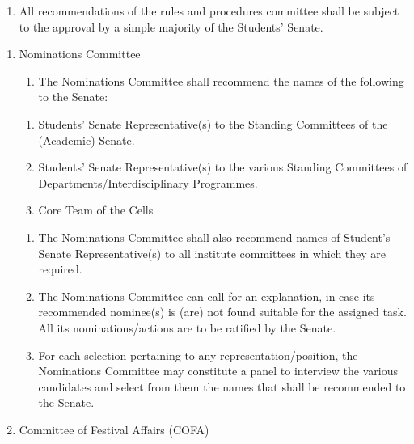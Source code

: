 \begin{enumerate}
\def\labelenumi{\alph{enumi}.}
\setcounter{enumi}{1}
\itemsep1pt\parskip0pt
\item
  All recommendations of the rules and procedures committee shall be
  subject to the approval by a simple majority of the Students' Senate.
\end{enumerate}

\begin{enumerate}
\def\labelenumi{\arabic{enumi}.}
\setcounter{enumi}{3}
\item
  Nominations Committee

  \begin{enumerate}
  \def\labelenumii{\alph{enumii}.}
  \itemsep1pt\parskip0pt
  \item
    The Nominations Committee shall recommend the names of the following
    to the Senate:
  \end{enumerate}

  \begin{enumerate}
  \def\labelenumii{\arabic{enumii}.}
  \item
    Students' Senate Representative(s) to the Standing Committees of the
    (Academic) Senate.
  \item
    Students' Senate Representative(s) to the various Standing
    Committees of Departments/Interdisciplinary Programmes.
  \item
    Core Team of the Cells
  \end{enumerate}

  \begin{enumerate}
  \def\labelenumii{\alph{enumii}.}
  \setcounter{enumii}{1}
  \item
    The Nominations Committee shall also recommend names of Student's
    Senate Representative(s) to all institute committees in which they
    are required.
  \item
    The Nominations Committee can call for an explanation, in case its
    recommended nominee(s) is (are) not found suitable for the assigned
    task. All its nominations/actions are to be ratified by the Senate.
  \item
    For each selection pertaining to any representation/position, the
    Nominations Committee may constitute a panel to interview the
    various candidates and select from them the names that shall be
    recommended to the Senate.
  \end{enumerate}
\item
  Committee of Festival Affairs (COFA)


\end{enumerate}
